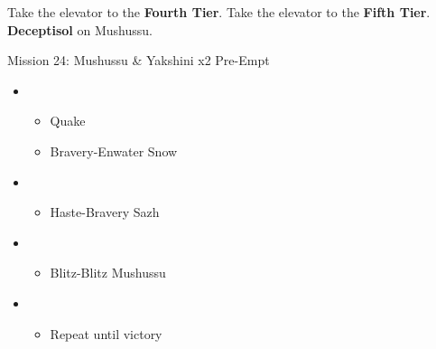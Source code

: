 \begin{multicols}{2}
Take the elevator to the \textbf{Fourth Tier}.
Take the elevator to the \textbf{Fifth Tier}.
\textbf{Deceptisol} on Mushussu.

\begin{battle}{Mission 24: Mushussu \& Yakshini x2 Pre-Empt}
\begin{itemize}
    \item \first
    \begin{itemize}
        \item Quake
        \item Bravery-Enwater Snow
    \end{itemize}
    \item \fifth
    \begin{itemize}
        \item Haste-Bravery Sazh
    \end{itemize}
    \item \fourth
    \begin{itemize}
        \item Blitz-Blitz Mushussu
    \end{itemize}
    \item \second
    \begin{itemize}
        \item Repeat until victory
    \end{itemize}
\end{itemize}
\end{battle}


\end{multicols}
